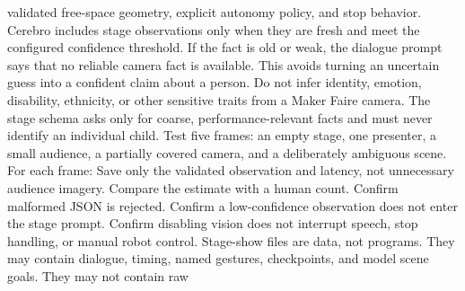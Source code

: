 {}validated free-space geometry, explicit autonomy policy, and stop behavior.\markdownRendererInterblockSeparator
{}
\markdownRendererSectionEnd \markdownRendererSectionBegin
{}\markdownRendererInterblockSeparator
{}Cerebro includes stage observations only when they are fresh and meet the\markdownRendererSoftLineBreak
{}configured confidence threshold. If the fact is old or weak, the dialogue\markdownRendererSoftLineBreak
{}prompt says that no reliable camera fact is available. This avoids turning an\markdownRendererSoftLineBreak
{}uncertain guess into a confident claim about a person.\markdownRendererParagraphSeparator
{}Do not infer identity, emotion, disability, ethnicity, or other sensitive\markdownRendererSoftLineBreak
{}traits from a Maker Faire camera. The stage schema asks only for coarse,\markdownRendererSoftLineBreak
{}performance-relevant facts and must never identify an individual child.\markdownRendererInterblockSeparator
{}
\markdownRendererSectionEnd \markdownRendererSectionBegin
{}\markdownRendererInterblockSeparator
{}Test five frames: an empty stage, one presenter, a small audience, a partially\markdownRendererSoftLineBreak
{}covered camera, and a deliberately ambiguous scene. For each frame:\markdownRendererInterblockSeparator
{}\markdownRendererOlBegin
{}Save only the validated observation and latency, not unnecessary audience\markdownRendererSoftLineBreak
{}imagery.\markdownRendererOlItemEnd 
{}Compare the estimate with a human count.\markdownRendererOlItemEnd 
{}Confirm malformed JSON is rejected.\markdownRendererOlItemEnd 
{}Confirm a low-confidence observation does not enter the stage prompt.\markdownRendererOlItemEnd 
{}Confirm disabling vision does not interrupt speech, stop handling, or\markdownRendererSoftLineBreak
{}manual robot control.\markdownRendererOlItemEnd 
\markdownRendererOlEnd \markdownRendererInterblockSeparator
{}\markdownRendererThematicBreak{}\markdownRendererInterblockSeparator
{}
\markdownRendererSectionEnd 
\markdownRendererSectionEnd \markdownRendererSectionBegin
{}\markdownRendererInterblockSeparator
{}Stage-show files are data, not programs. They may contain dialogue, timing,\markdownRendererSoftLineBreak
{}named gestures, checkpoints, and model scene goals. They may not contain raw\markdownRendererSoftLineBreak
